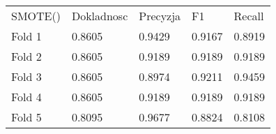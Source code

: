 \begin{tabular}{lllll}
\hline
 SMOTE() & Dokladnosc & Precyzja & F1     & Recall \\
 Fold 1  & 0.8605     & 0.9429   & 0.9167 & 0.8919 \\
 Fold 2  & 0.8605     & 0.9189   & 0.9189 & 0.9189 \\
 Fold 3  & 0.8605     & 0.8974   & 0.9211 & 0.9459 \\
 Fold 4  & 0.8605     & 0.9189   & 0.9189 & 0.9189 \\
 Fold 5  & 0.8095     & 0.9677   & 0.8824 & 0.8108 \\
\hline
\end{tabular}